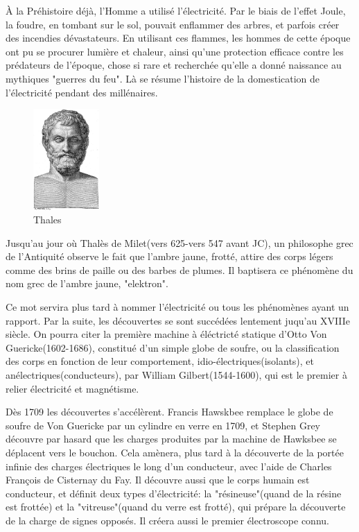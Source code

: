 \documentclass[12pt]{report}
\begin{document}
	    À la Préhistoire déjà, l'Homme a utilisé l'électricité. Par le biais de l'effet Joule, la foudre, en tombant sur le sol, pouvait enflammer des arbres, et parfois créer des incendies dévastateurs. En utilisant ces flammes, les hommes de cette époque ont pu se procurer lumière et chaleur, ainsi qu'une protection efficace contre les prédateurs de l'époque, chose si rare et recherchée qu'elle a donné naissance au mythiques "guerres du feu". Là se résume l'histoire de la domestication de l'électricité pendant des millénaires.
\begin{figure}
  \begin{center}
    \includegraphics[width=0.225\textwidth]{thales}
  \end{center}
  \caption{Thales}
\end{figure} Jusqu'au jour où Thalès de Milet(vers 625-vers 547 avant JC), un philosophe grec de l'Antiquité observe le fait que l'ambre jaune, frotté, attire des corps légers comme des brins de paille ou des barbes de plumes. Il baptisera ce phénomène du nom grec de l'ambre jaune, "elektron".

  Ce mot servira plus tard à nommer l'électricité ou tous les phénomènes ayant un rapport. Par la suite, les découvertes se sont succédées lentement juqu'au XVIIIe siècle. On pourra citer la première machine à éléctricté statique d'Otto Von Guericke(1602-1686), constitué d'un simple globe de soufre, ou la classification des corps en fonction de leur comportement, idio-électriques(isolants), et anélectriques(conducteurs), par William Gilbert(1544-1600), qui est le premier à relier électricité et magnétisme.

    Dès 1709 les découvertes s'accélèrent. Francis Hawskbee remplace le globe de soufre de Von Guericke par un cylindre en verre en 1709, et Stephen Grey découvre par hasard que les charges produites par la machine de Hawksbee se déplacent vers le bouchon. Cela amènera, plus tard à la découverte de la portée infinie des charges électriques le long d'un conducteur, avec l'aide de Charles François de Cisternay du Fay. Il découvre aussi que le corps humain est conducteur, et définit deux types d'électricité: la "résineuse"(quand de la résine est frottée) et la "vitreuse"(quand du verre est frotté), qui prépare la découverte de la charge de signes opposés. Il créera aussi le premier électroscope connu.
\end{document}
